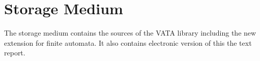 \chapter{Storage Medium}
The storage medium contains the sources of the VATA library including the new extension for finite automata. It also contains electronic version of this the text
report.

